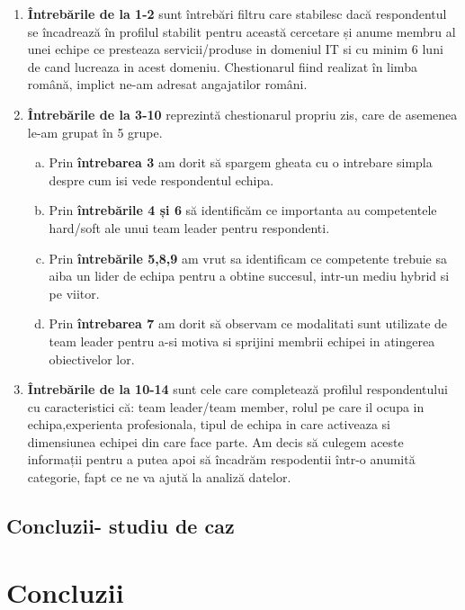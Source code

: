 \documentclass[a4paper, 12pt]{article}
\begin{document}
\begin{enumerate}[(1)]
			\item\textbf{Întrebările de la 1-2}  sunt întrebări filtru care stabilesc dacă respondentul se încadrează în profilul stabilit pentru această cercetare și anume membru al unei echipe ce presteaza servicii/produse in domeniul IT si cu minim 6 luni de cand lucreaza in acest domeniu. Chestionarul fiind realizat în limba română, implict ne-am adresat angajatilor români. 
			\item\textbf{Întrebările de la 3-10} reprezintă chestionarul propriu zis, care de asemenea le-am grupat în 5 grupe.
		\begin{enumerate}[(a)]
			\item Prin \textbf{întrebarea 3} am dorit să spargem gheata cu o intrebare simpla despre cum isi vede respondentul echipa.
			\item Prin \textbf{întrebările 4 și 6} să identificăm ce importanta au competentele hard/soft ale unui team leader pentru respondenti.
			\item Prin \textbf{întrebările 5,8,9} am vrut sa identificam ce competente trebuie sa aiba un lider de echipa pentru a obtine succesul, intr-un mediu hybrid si pe viitor.
			\item Prin \textbf{întrebarea 7} am dorit să observam ce modalitati sunt utilizate de team leader pentru a-si motiva si sprijini membrii echipei in atingerea obiectivelor lor.
		\end{enumerate}
		\item\textbf{Întrebările de la 10-14} sunt cele care completează profilul respondentului cu caracteristici că: team leader/team member, rolul pe care il ocupa in echipa,experienta profesionala, tipul de echipa in care activeaza si dimensiunea echipei din care face parte. Am decis să culegem aceste informații pentru a putea apoi să încadrăm respodentii într-o anumită categorie, fapt ce ne va ajută la analiză datelor.
	\end{enumerate}




	\subsection{ Concluzii- studiu de caz}

\newpage
\setcounter{section}{3}
	\section{Concluzii}	
\end{document}
